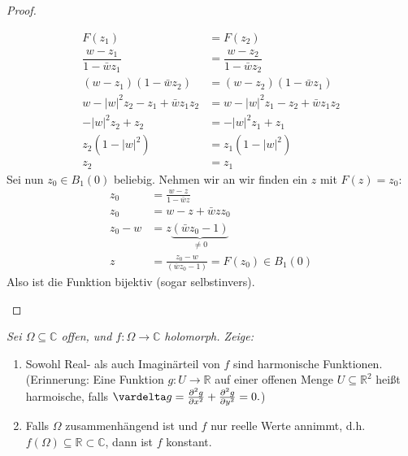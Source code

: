\documentclass[11pt]{article}
\newcommand{\R}{\mathbb{R}}
\newcommand{\C}{\mathbb{C}}
\newenvironment{problem}[2][Beispiel]{
    \begin{trivlist}
        \item[\hskip \labelsep {\bfseries #1}\hskip \labelsep {\bfseries #2.}] \itshape}{
    \end{trivlist}\normalshape
}
\begin{document}
\begin{proof}
\begin{enumerate}[label=(\alph*)]
            $$\begin{aligned}
                  F(z_1) &= F(z_2)\\
                  \dfrac{w-z_1}{1-\bar{w}z_1} &= \dfrac{w-z_2}{1-\bar{w}z_2}\\
                  (w-z_1)(1-\bar{w}z_2) &= (w-z_2)(1-\bar{w}z_1)\\
                  w-|w|^{2}z_2-z_1+\bar{w}z_1z_2 &= w-|w|^{2}z_1-z_2+\bar{w}z_1z_2\\
                  -|w|^{2}z_2+z_2 &= -|w|^{2}z_1+z_1\\
                  z_2 (1-|w|^2) &= z_1 (1-|w|^2)\\
                  z_2&= z_1
            \end{aligned}$$
            Sei nun $z_0\in B_1(0)$ beliebig. Nehmen wir an wir finden ein $z$ mit
            $F(z) = z_0$:
            $$\begin{aligned}
                  z_0 &= \frac{w-z}{1-\bar{w}z}\\
                  z_0 &= w-z+\bar{w}zz_0\\
                  z_0 -w &= z \underbrace{(\bar{w}z_0 -1)}_{\neq 0}\\
                  z &= \frac{z_0 -w}{(\bar{w}z_0 -1)} = F(z_0)\in B_1(0)
            \end{aligned}$$
            Also ist die Funktion bijektiv (sogar selbstinvers).
            
        \end{enumerate}
    \end{proof}

    \begin{problem}{4}
        Sei $\Omega\subseteq \C$ offen, und $f:\Omega \to \C$ holomorph. Zeige:
        \begin{enumerate}[label=(\alph*)]
            \item Sowohl Real- als auch Imaginärteil von $f$ sind harmonische
            Funktionen. \\(Erinnerung: Eine Funktion $g:U\to \R$ auf einer offenen
            Menge $U\subseteq \R^2$ heißt harmoische, falls $\vardelta g=
            \frac{\partial^2 g}{\partial x^2}+\frac{\partial^2 g}{\partial y^2}=0.$)
            \item Falls $\Omega$ zusammenhängend ist und $f$ nur reelle Werte annimmt,
            d.h. $f(\Omega)\subseteq \R\subset \C$, dann ist $f$ konstant.
        \end{enumerate}
    \end{problem}
\end{document}
